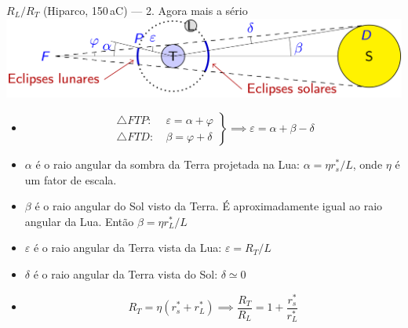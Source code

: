 \documentclass[beamer,9pt,aspectratio=169]{beamer}
\begin{document}
\begin{frame}[label=rtrl]{$R_L/R_T$ (Hiparco, 150\,aC)
  --- 2. Agora mais a sério}
  \includegraphics{figs/f2.png}
  \pause
  \begin{itemize} 
    \item 
      \begin{equation*}
        \left.
          \begin{aligned}
            \triangle FTP:\ &\varepsilon=\alpha +\varphi \\
            \triangle FTD:\ &\beta=\varphi +\delta 
          \end{aligned}
        \right\}
        \implies \varepsilon=\alpha+\beta-\delta
      \end{equation*}
    \item
      $\alpha$ é o raio angular da sombra da Terra projetada na Lua:
      $\alpha=\eta r^*_s/L$, onde $\eta$ é um fator de escala.
    \item 
      $\beta$ é o raio angular do Sol visto da Terra. É aproximadamente
      igual ao raio angular da Lua. Então $\beta = \eta r^*_L/L$
    \item 
      $\varepsilon$ é o raio angular da Terra vista da Lua: $\varepsilon=R_T/L$
    \item 
      $\delta$ é o raio angular da Terra vista do Sol: $\delta\simeq0$
    \item 
      \begin{equation*}
        R_T=\eta (r^*_s+r^*_L)\implies \frac{R_T}{R_L}=1+\frac{r^*_s}{r^*_L}
      \end{equation*}
  \end{itemize}
\end{frame}
\end{document}
